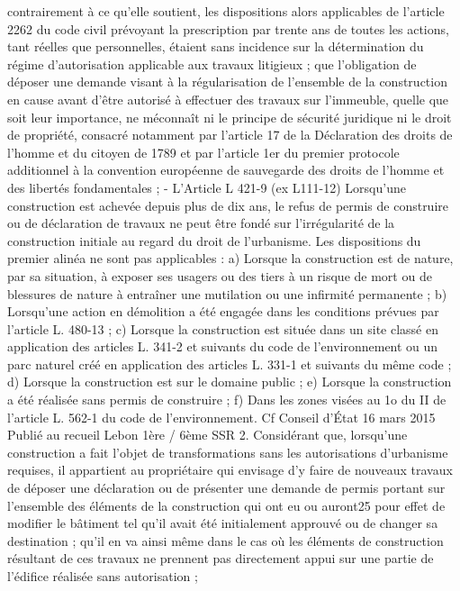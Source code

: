 \documentclass[11pt,a4paper]{report}
\begin{document}
	contrairement à ce qu'elle soutient, les dispositions alors applicables de l'article 2262 du code civil prévoyant la
	prescription par trente ans de toutes les actions, tant réelles que personnelles, étaient sans incidence sur la
	détermination du régime d'autorisation applicable aux travaux litigieux ; que l'obligation de déposer une
	demande visant à la régularisation de l'ensemble de la construction en cause avant d'être autorisé à effectuer
	des travaux sur l'immeuble, quelle que soit leur importance, ne méconnaît ni le principe de sécurité juridique ni
	le droit de propriété, consacré notamment par l'article 17 de la Déclaration des droits de l'homme et du citoyen
	de 1789 et par l'article 1er du premier protocole additionnel à la convention européenne de sauvegarde des
	droits de l'homme et des libertés fondamentales ;
	- L’Article L 421-9 (ex L111-12)
	Lorsqu'une construction est achevée depuis plus de dix ans, le refus de permis de construire ou de déclaration de
	travaux ne peut être fondé sur l'irrégularité de la construction initiale au regard du droit de l'urbanisme.
	Les dispositions du premier alinéa ne sont pas applicables :
	a) Lorsque la construction est de nature, par sa situation, à exposer ses usagers ou des tiers à un risque de
	mort ou de blessures de nature à entraîner une mutilation ou une infirmité permanente ;
	b) Lorsqu'une action en démolition a été engagée dans les conditions prévues par l'article L. 480-13 ;
	c) Lorsque la construction est située dans un site classé en application des articles L. 341-2 et suivants du code
	de l'environnement ou un parc naturel créé en application des articles L. 331-1 et suivants du même code ;
	d) Lorsque la construction est sur le domaine public ;
	e) Lorsque la construction a été réalisée sans permis de construire ;
	f) Dans les zones visées au 1o du II de l'article L. 562-1 du code de l'environnement.
	Cf Conseil d'État 16 mars 2015  Publié au recueil Lebon 1ère / 6ème SSR
	2. Considérant que, lorsqu'une construction a fait l'objet de transformations sans les autorisations d'urbanisme
	requises, il appartient au propriétaire qui envisage d'y faire de nouveaux travaux de déposer une déclaration ou
	de présenter une demande de permis portant sur l'ensemble des éléments de la construction qui ont eu ou auront25
	pour effet de modifier le bâtiment tel qu'il avait été initialement approuvé ou de changer sa destination ; qu'il en
	va ainsi même dans le cas où les éléments de construction résultant de ces travaux ne prennent pas directement
	appui sur une partie de l'édifice réalisée sans autorisation ;
\end{document}
